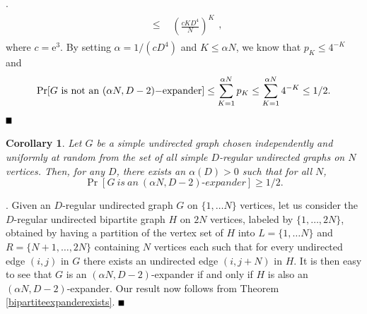 \documentclass{article}
\newtheorem{corollary}[theorem]{Corollary}
\newcommand{\bproof}{\noindent{\bf Proof}}
\newcommand{\eproof}{\hspace*{\fill}$\rule{2mm}{2mm}$~~~~\bigskip}
\renewenvironment{proof}{\bproof. }{\eproof}
\begin{document}
\begin{proof}
\begin{eqnarray*}
&\leq&\begin{array}{c}\left(\frac{cKD^4}{N}\right )^K\end{array},
\end{eqnarray*}
where $c=\mathrm{e}^3$. By setting $\alpha=1/(cD^4)$ and $K\leq \alpha N$, we know that $p_K\leq 4^{-K}$ and
\[
\Pr[G~{\rm is~not~an~(}\alpha N,D-2){\rm -expander}]\leq \sum_{K=1}^{\alpha N}p_K\leq\sum_{K=1}^{\alpha N}4^{-K}\leq 1/2.
\]
\end{proof}
\begin{corollary}
Let $G$ be a simple undirected graph chosen independently and uniformly at random from the set of all simple $D$-regular undirected graphs on $N$ vertices. Then, for any $D$, there exists an $\alpha (D)>0$ such that for all $N$,
\[
\Pr [G{~is~an~}(\alpha N,D-2){\textrm{-}expander}]\geq1/2.
\]
\end{corollary}
\begin{proof}
Given an $D$-regular undirected graph $G$ on $\{1,\ldots N\}$ vertices, let us consider the $D$-regular undirected bipartite graph $H$ on $2N$ vertices, labeled by $\{1,\ldots ,2N\}$, obtained by having a partition of the vertex set of $H$ into $L=\{1,\ldots N\}$ and $R=\{N+1,\ldots ,2N\}$ containing $N$ vertices each such that for every undirected edge $(i,j)$ in $G$ there exists an undirected edge $(i,j+N)$ in $H$. It is then easy to see that $G$ is an $(\alpha N,D-2)$-expander if and only if $H$ is also an $(\alpha N,D-2)$-expander. Our result now follows from  Theorem \ref{bipartiteexpanderexists}.
\end{proof}
\end{document}
